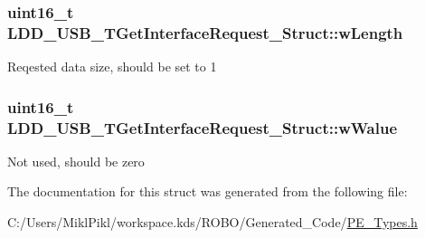 \subsubsection[{w\+Length}]{\setlength{\rightskip}{0pt plus 5cm}uint16\+\_\+t L\+D\+D\+\_\+\+U\+S\+B\+\_\+\+T\+Get\+Interface\+Request\+\_\+\+Struct\+::w\+Length}\label{struct_l_d_d___u_s_b___t_get_interface_request___struct_a2aa1550fc5e72002a94c74ea0957ec74}
Reqested data size, should be set to 1 \hypertarget{struct_l_d_d___u_s_b___t_get_interface_request___struct_a48bcaf6af044e3e9669f5ea634a2b9fe}{}
\subsubsection[{w\+Walue}]{\setlength{\rightskip}{0pt plus 5cm}uint16\+\_\+t L\+D\+D\+\_\+\+U\+S\+B\+\_\+\+T\+Get\+Interface\+Request\+\_\+\+Struct\+::w\+Walue}\label{struct_l_d_d___u_s_b___t_get_interface_request___struct_a48bcaf6af044e3e9669f5ea634a2b9fe}
Not used, should be zero 

The documentation for this struct was generated from the following file\+:\begin{DoxyCompactItemize}
\item 
C\+:/\+Users/\+Mikl\+Pikl/workspace.\+kds/\+R\+O\+B\+O/\+Generated\+\_\+\+Code/\hyperlink{_p_e___types_8h}{P\+E\+\_\+\+Types.\+h}\end{DoxyCompactItemize}

